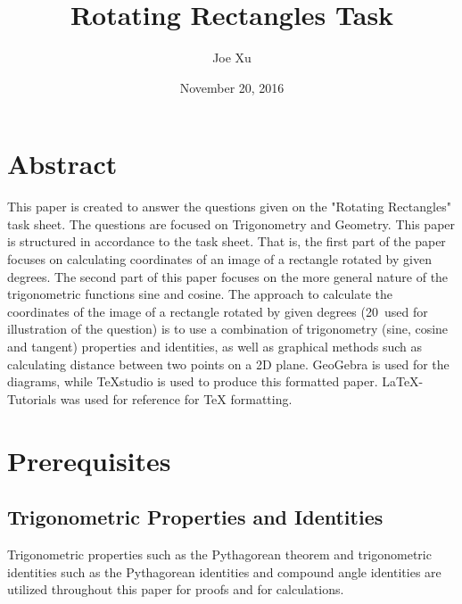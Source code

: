 \documentclass{article}
\title  {Rotating Rectangles Task}
\date   {November 20, 2016}
\author {Joe Xu}
\begin{document}
    \maketitle
    \newpage
    
    \section*{Abstract}
        This paper is created to answer the questions given on the "Rotating Rectangles" task sheet. The questions are focused on  Trigonometry and Geometry.
        \newline\newline
        This paper is structured in accordance to the task sheet. That is, the first part of the paper focuses on calculating coordinates of an image of a rectangle rotated by given degrees. The second part of this paper focuses on the more general nature of the trigonometric functions sine and cosine.
        \newline\newline
        The approach to calculate the coordinates of the image of a rectangle rotated by given degrees (20\degree \ used for illustration of the question) is to use a combination of trigonometry (sine, cosine and tangent) properties and identities, as well as graphical methods such as calculating distance between two points on a 2D plane.
        \newline\newline
        GeoGebra\autocite{GEOGEBRA:1} is used for the diagrams, while TeXstudio\autocite{TEXSTUDIO:1} is used to produce this formatted paper. LaTeX-Tutorials\autocite{LATEX:1} was used for reference for TeX formatting.
    \newpage
    
    \tableofcontents
    \newpage
    
        
    \section{Prerequisites}
        \subsection{Trigonometric Properties and Identities}
        Trigonometric properties such as the Pythagorean theorem and trigonometric identities such as the Pythagorean identities and compound angle identities are utilized throughout this paper for proofs and for calculations.
\end{document}
